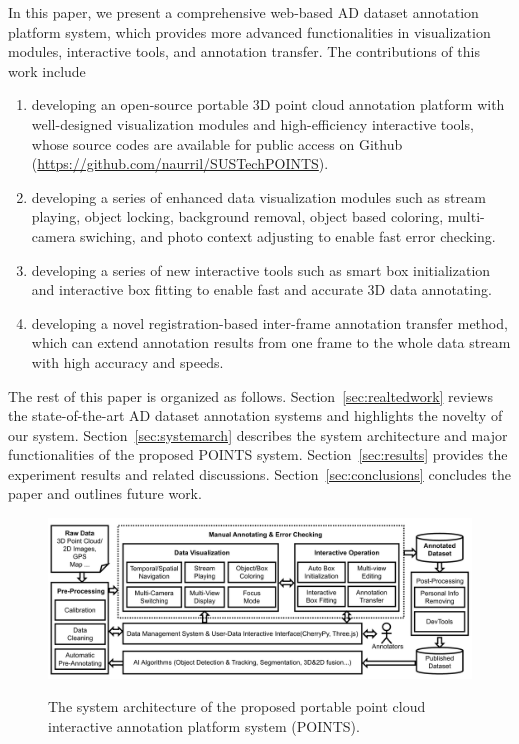 \documentclass[letterpaper, 10 pt, conference]{ieeeconf}  %
\begin{document}
In this paper, we present a comprehensive web-based AD dataset annotation platform system, which provides more advanced functionalities in visualization modules, interactive tools, and annotation transfer. The contributions of this work include
\begin{enumerate}
	\item developing an open-source portable 3D point cloud annotation platform with well-designed visualization modules and high-efficiency interactive tools, whose source codes are available for public access on Github (\url{https://github.com/naurril/SUSTechPOINTS}).
	\item developing a series of enhanced data visualization modules such as stream playing, object locking, background removal, object based coloring, multi-camera
swiching, and photo context adjusting to enable fast error checking.
	\item developing a series of new interactive tools such as smart box initialization and interactive box fitting to enable fast and accurate 3D data annotating.
	\item developing a novel registration-based inter-frame annotation transfer method, which can extend annotation results from one frame to the whole data stream with high accuracy and speeds.

\end{enumerate}



The rest of this paper is organized as follows. 
Section~\ref{sec:realtedwork}  reviews the state-of-the-art AD dataset annotation systems and highlights the novelty of our system. 
Section~\ref{sec:systemarch} describes the system architecture and major functionalities of the proposed POINTS system. 
Section~\ref{sec:results} provides the experiment results and related discussions. 
Section~\ref{sec:conclusions} concludes the paper and outlines future work.





\begin{figure}[t]
	
	\centering
	\vspace{-0.1cm}
	\includegraphics[width=1.0\linewidth]{./arch-big}\\ %
	\caption{The system architecture of the proposed portable point cloud interactive annotation platform system (POINTS).}
	\label{fig:arch_layer}
\end{figure}
\end{document}
